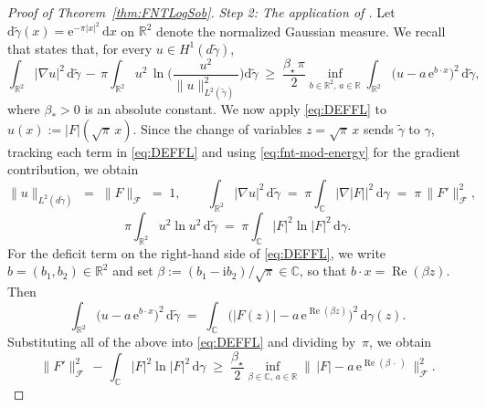 \documentclass[11pt]{amsart}
\theoremstyle{remark}
\newcommand{\C}{\mathbb{C}}
\newcommand{\abs}[1]{\lvert #1 \rvert}
\newcommand{\norm}[1]{\lVert #1 \rVert}
\newcommand{\dd}{\mathrm{d}}
\newcommand{\ee}{\mathrm{e}}
\newcommand{\ii}{\mathrm{i}}
\begin{document}
\begin{proof}[Proof of Theorem~\ref{thm:FNTLogSob}]
\medskip
\noindent
\emph{Step 2: The application of \cite[Corollary~1.2]{DolbeaultEstebanFigalliFrankLoss2025}.}\;
Let $\dd\widetilde{\gamma}(x) = \ee^{-\pi \abs{x}^2}\,\dd x$
on $\mathbb{R}^2$ denote the normalized 
Gaussian measure. We recall that
\cite[Corollary~1.2]{DolbeaultEstebanFigalliFrankLoss2025} states that, for
every $u \in H^1(d\widetilde{\gamma})$,
\begin{equation}\label{eq:DEFFL}
\int_{\mathbb{R}^2} \abs{\nabla u}^2\, \dd\widetilde{\gamma}
\,-\, \pi \int_{\mathbb{R}^2} u^2\, \ln\!\biggl(\frac{u^2}{\norm{u}_{L^2(\widetilde{\gamma})}^2}\biggr) \dd\widetilde{\gamma}
\;\ge\;
\frac{\beta_\star\, \pi}{2}
\inf_{b \in \mathbb{R}^2,\, a \in \mathbb{R}}
\int_{\mathbb{R}^2} \bigl(u - a\, \ee^{b\cdot x}\bigr)^2\, \dd\widetilde{\gamma},
\end{equation}
where $\beta_* > 0$ is an absolute constant. We now apply
\eqref{eq:DEFFL} to $u(x) := \abs{F}(\sqrt{\pi}\, x)$.  Since the change of 
variables $z = \sqrt{\pi}\, x$ sends $\tilde{\gamma}$ to $\gamma$, tracking
each term in \eqref{eq:DEFFL} and using \eqref{eq:fnt-mod-energy} for the gradient contribution, we obtain
\[
\norm{u}_{L^2(d\widetilde{\gamma})}
\;=\; \norm{F}_{\mathcal{F}} \;=\; 1,
\qquad
\int_{\mathbb{R}^2} \abs{\nabla u}^2\, \dd\widetilde{\gamma}
\;=\; \pi \int_{\C} \abs{\nabla \abs{F}}^2\, \dd\gamma
\;=\; \pi\, \norm{F'}_{\mathcal{F}}^2,
\]
\[
\pi \int_{\mathbb{R}^2} u^2 \ln u^2\, \dd\widetilde{\gamma}
\;=\; \pi \int_{\C} \abs{F}^2 \ln \abs{F}^2\, \dd\gamma.
\]
For the deficit term on the right-hand side of \eqref{eq:DEFFL}, we write
$b = (b_1, b_2) \in \mathbb{R}^2$ and set
$\beta := (b_1 - \ii b_2) / \sqrt{\pi} \in \C$, so that
$b\cdot x = \operatorname{Re}(\beta z)$. Then
\[
\int_{\mathbb{R}^2} \bigl(u - a\, \ee^{b\cdot x}\bigr)^2\, \dd\widetilde{\gamma}
\;=\;
\int_{\C} \bigl(\abs{F(z)} - a\, \ee^{\operatorname{Re}(\beta z)}\bigr)^2\, \dd\gamma(z).
\]
Substituting all of the above into \eqref{eq:DEFFL} and dividing by~$\pi$, we obtain
\begin{equation}\label{eq:fnt-DEFFL-applied}
\norm{F'}_{\mathcal{F}}^2
\,-\, \int_{\C} \abs{F}^2 \ln \abs{F}^2\, \dd\gamma
\;\ge\;
\frac{\beta_\star}{2}
\inf_{\beta \in \C,\, a \in \mathbb{R}}
\norm{\, \abs{F} - a\, \ee^{\operatorname{Re}(\beta\,\cdot\,)} \,}_{\mathcal{F}}^2.
\end{equation}


\end{proof}
\end{document}
